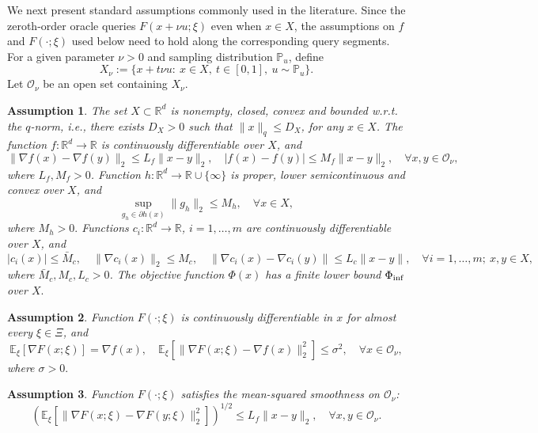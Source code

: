 \documentclass[11pt]{article}
\newtheorem{assumption}{Assumption}[section]
\numberwithin{equation}{section}
\newcommand{\R}{\mathbb{R}}
\newcommand{\E}{\mathbb{E}}
\begin{document}
We next present standard assumptions commonly used in the literature.
Since the zeroth-order oracle queries $F(x+\nu u;\xi)$ even when $x\in X$, the
assumptions on $f$ and $F(\cdot;\xi)$ used below need to hold along the corresponding query segments. For a given 
parameter $\nu>0$ and sampling distribution $\mathbb P_u$, define
\[
    X_\nu:=\{x+t\nu u:\ x\in X,\ t\in[0,1],\ u \sim\mathbb P_u\}.
\]
Let $\mathcal O_\nu$ be an open set containing $X_\nu$.
\begin{assumption}\label{ass:lip}
    The set $X \subset \R^d$ is nonempty, closed, convex and bounded w.r.t. the $q$-norm, i.e., there exists  $D_X>0$ such that $\|x\|_q \le D_X$, for any $x\in X$. The function $f:\R^d \rightarrow \R$ is continuously differentiable over $X$, and  $$\|\nabla f(x)-\nabla f(y)\|_2\le L_f\|x-y\|_2,\quad | f(x) - f(y) | \leq M_f\| x - y\|_2, \quad \forall  x,y\in \mathcal O_\nu,$$
    where $L_f, M_f>0$. 
    Function {$h:\R^d \to \R\cup \{\infty\}$} is proper, lower semicontinuous and convex over $X$, and 
    \[\sup_{g_h \in \partial h(x)} \|g_h\|_2 \leq M_h, \quad  \forall x\in X,\]
    where $M_h>0.$ 
    Functions $c_i:\R^d \rightarrow \R$, $i=1,\ldots,m$ are continuously differentiable over $X$, and 
    $$ |c_i(x)|\le \bar M_c, \quad \|\nabla c_i(x)\|_2\le M_c, \quad \|\nabla c_i(x)-\nabla c_i(y)\|\le L_c\|x-y\|, \quad \forall i=1,\ldots,m;\ x,y\in X,$$
    where $\bar M_c, M_c, L_c>0$. The objective function $\Phi(x)$ has a finite lower bound $\Phi_{\rm inf}$ over $X.$
\end{assumption}


\begin{assumption}\label{ass:u}
  Function \(F(\cdot;\xi)\) is continuously differentiable in
\(x\) for almost every \(\xi\in\Xi\), and 
\[
\E_\xi[\nabla F(x;\xi)]=\nabla f(x), \quad \E_\xi[
\|\nabla F(x;\xi)-\nabla f(x)\|_2^2
]
\le\sigma^2,
\quad
\forall x\in\mathcal O_\nu,
\]
where $\sigma >0.$
\end{assumption}

\begin{assumption}\label{ass:ms-p}
  Function \(F(\cdot;\xi)\) satisfies the mean-squared smoothness on
\(\mathcal O_\nu\):  
\[
(\E_\xi[
\|\nabla F(x;\xi)-\nabla F(y;\xi)\|_2^2
])^{1/2}
\le L_f\|x-y\|_2,
\quad\forall 
x,y\in\mathcal O_\nu.
\]
\end{assumption}
\end{document}
